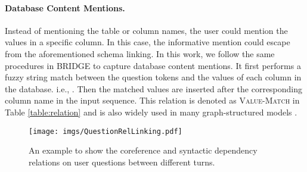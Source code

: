 \documentclass[11pt]{article}
\begin{document}
\paragraph{Database Content Mentions.} Instead of mentioning the table or column names, the user could mention the values in a specific column. In this case, the informative mention could escape from the aforementioned schema linking. In this work, we follow the same procedures in BRIDGE \citep{lin-etal-2020-bridging} to capture database content mentions. It first performs a fuzzy string match between the question tokens and the values of each column in the database. i.e., . Then the matched values are inserted after the corresponding column name in the input sequence. This relation is denoted as \textsc{Value-Match} in Table \ref{table:relation} and is also widely used in many graph-structured models \citep{wang-etal-2020-rat, cao-etal-2021-lgesql}. 


\begin{figure}
    \centering
    \texttt{[image: imgs/QuestionRelLinking.pdf]}
    \caption{An example to show the coreference and syntactic dependency relations on user questions between different turns.}
    \label{fig:coref}
\end{figure}
\end{document}
